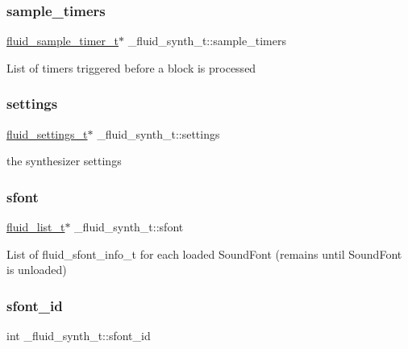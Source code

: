 \subsubsection{\texorpdfstring{sample\+\_\+timers}{sample\_timers}}
{\footnotesize\ttfamily \hyperlink{fluidsynth__priv_8h_a4ddade88911e1873bccda1a7750a848c}{fluid\+\_\+sample\+\_\+timer\+\_\+t}$\ast$ \+\_\+fluid\+\_\+synth\+\_\+t\+::sample\+\_\+timers}

List of timers triggered before a block is processed \mbox{\label{struct__fluid__synth__t_a443a36b056edaf9f15a6f7e15f579663}} 
\subsubsection{\texorpdfstring{settings}{settings}}
{\footnotesize\ttfamily \hyperlink{types_8h_aa363402d3c77333b0f070ba531d034ba}{fluid\+\_\+settings\+\_\+t}$\ast$ \+\_\+fluid\+\_\+synth\+\_\+t\+::settings}

the synthesizer settings \mbox{\label{struct__fluid__synth__t_ad37c16bfed217f7053c2b2876fea4ebc}} 
\subsubsection{\texorpdfstring{sfont}{sfont}}
{\footnotesize\ttfamily \hyperlink{fluid__list_8h_a3ef7535d4290862c0af118569223bd89}{fluid\+\_\+list\+\_\+t}$\ast$ \+\_\+fluid\+\_\+synth\+\_\+t\+::sfont}

List of fluid\+\_\+sfont\+\_\+info\+\_\+t for each loaded Sound\+Font (remains until Sound\+Font is unloaded) \mbox{\label{struct__fluid__synth__t_a64d274cd2a1debace88ce6acc22048a9}} 
\subsubsection{\texorpdfstring{sfont\+\_\+id}{sfont\_id}}
{\footnotesize\ttfamily int \+\_\+fluid\+\_\+synth\+\_\+t\+::sfont\+\_\+id}

